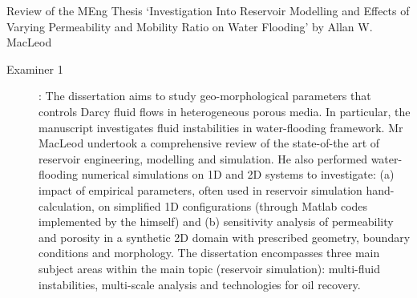\documentclass[14pt,twoside]{report}
\begin{document}
\bigskip

\begin{center}
  {\Large Review of the MEng Thesis `Investigation Into Reservoir Modelling and Effects of Varying Permeability and Mobility Ratio on Water Flooding' by Allan W. MacLeod}
\end{center}

\begin{description}
\item[Examiner 1]: The dissertation aims to study geo-morphological parameters that controls Darcy fluid flows in heterogeneous porous media. In particular, the manuscript investigates fluid instabilities in water-flooding framework. Mr MacLeod undertook a comprehensive review of the state-of-the art of reservoir engineering, modelling and simulation. He also performed water-flooding numerical simulations on 1D and 2D systems to investigate: (a) impact of empirical parameters, often used in reservoir simulation hand-calculation, on simplified 1D configurations (through Matlab codes implemented by the himself) and (b) sensitivity analysis of permeability and porosity in a synthetic 2D domain with prescribed geometry, boundary conditions and morphology. The dissertation encompasses three main subject areas within the main topic (reservoir simulation): multi-fluid instabilities, multi-scale analysis and technologies for oil recovery. 


\end{description}
\end{document}
